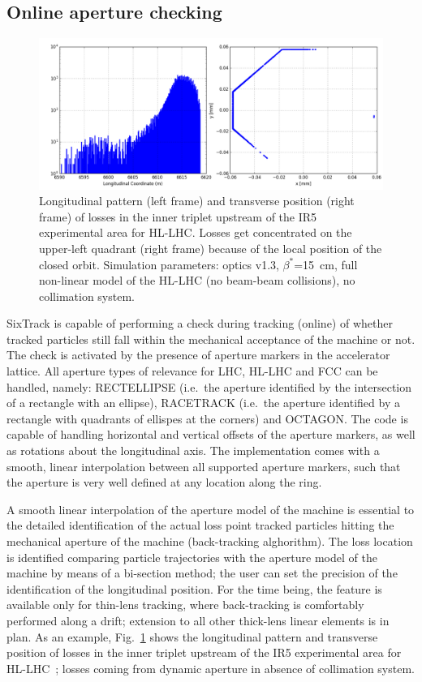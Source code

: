 \documentclass{ws-ijmpa}
\begin{document}
\subsection{Online aperture checking}
\begin{figure}[!tbh]
\centering
 \includegraphics[width=\textwidth]{losses_IR5_mod.png}
 \caption{Longitudinal pattern (left frame) and transverse position (right frame) of losses in the inner triplet upstream of the IR5 experimental area for HL-LHC. Losses get concentrated on the upper-left quadrant (right frame) because of the local position of the closed orbit. Simulation parameters: optics v1.3, $\beta^*$=15~cm, full non-linear model of the HL-LHC (no beam-beam collisions), no collimation system.}
 \label{fig:LM_IR5}
\end{figure}

SixTrack is capable of performing a check during tracking (online) of whether tracked particles still fall within the mechanical acceptance of the machine or not. The check is activated by the presence of aperture markers in the accelerator lattice. All aperture types of relevance for LHC, HL-LHC and FCC can be handled, namely: RECTELLIPSE (i.e.~the aperture identified by the intersection of a rectangle with an ellipse), RACETRACK (i.e.~the aperture identified by a rectangle with quadrants of ellispes at the corners) and OCTAGON. The code is capable of handling horizontal and vertical offsets of the aperture markers, as well as rotations about the longitudinal axis. The implementation comes with a smooth, linear interpolation between all supported aperture markers, such that the aperture is very well defined at any location along the ring.

A smooth linear interpolation of the aperture model of the machine is essential to the detailed identification of the actual loss point tracked particles hitting the mechanical aperture of the machine (back-tracking alghorithm). The loss location is identified comparing particle trajectories with the aperture model of the machine by means of a bi-section method; the user can set the precision of the identification of the longitudinal position. For the time being, the feature is available only for thin-lens tracking, where back-tracking is comfortably performed along a drift; extension to all other thick-lens linear elements is in plan. As an example, Fig.~\ref{fig:LM_IR5} shows the longitudinal pattern and transverse position of losses in the inner triplet upstream of the IR5 experimental area for HL-LHC~\cite{HL-TDR}; losses coming from dynamic aperture in absence of collimation system.
\end{document}
